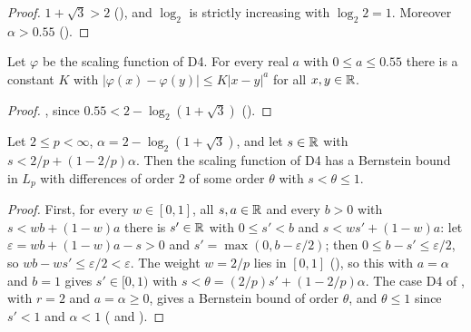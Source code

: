 \begin{proof}
\leanok
{}
$1 + \sqrt 3 > 2$ (), and $\log_2$ is strictly increasing with
$\log_2 2 = 1$. Moreover $\alpha > 0.55$ ().
\end{proof}

\begin{corollary}
\label{cor:daub-d4-holder-055}
\leanok
{}
Let $\varphi$ be the scaling function of D4. For every real $a$ with $0 \leq a \leq 0.55$ there is
a constant $K$ with $|\varphi(x) - \varphi(y)| \leq K |x - y|^a$ for all $x, y \in \mathbb{R}$.
\end{corollary}

\begin{proof}
\leanok
{}
, since $0.55 < 2 - \log_2(1 + \sqrt 3)$
().
\end{proof}

\begin{lemma}
\label{lem:daub-d4-bernstein}
\leanok
{}
Let $2 \leq p < \infty$, $\alpha = 2 - \log_2(1 + \sqrt 3)$, and let $s \in \mathbb{R}$ with
$s < 2/p + (1 - 2/p) \alpha$. Then the scaling function of D4 has a Bernstein bound in $L_p$ with
differences of order $2$ of some order $\theta$ with $s < \theta \leq 1$.
\end{lemma}

\begin{proof}
\leanok
{}
First, for every $w \in [0, 1]$, all $s, a \in \mathbb{R}$ and every $b > 0$ with
$s < w b + (1 - w) a$ there is $s' \in \mathbb{R}$ with $0 \leq s' < b$ and $s < w s' + (1 - w) a$: let
$\varepsilon = w b + (1 - w) a - s > 0$ and $s' = \max(0, b - \varepsilon/2)$; then
$0 \leq b - s' \leq \varepsilon/2$, so $w b - w s' \leq \varepsilon/2 < \varepsilon$. The weight
$w = 2/p$ lies in $[0, 1]$ (), so this with $a = \alpha$ and
$b = 1$ gives $s' \in [0, 1)$ with $s < \theta = (2/p) s' + (1 - 2/p) \alpha$. The case D4 of
, with $r = 2$ and $a = \alpha \geq 0$, gives a Bernstein bound
of order $\theta$, and $\theta \leq 1$ since $s' < 1$ and $\alpha < 1$
( and ).
\end{proof}


